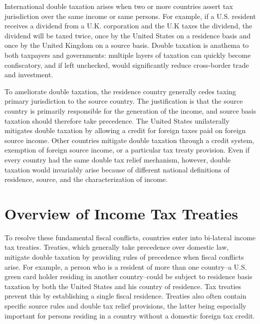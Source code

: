International double taxation arises when two or more countries assert tax jurisdiction over the same income or same persons.  For example, if a U.S. resident receives a dividend from a U.K. corporation and the U.K taxes the dividend, the dividend will be taxed twice, once by the United States on a residence basis and once by the United Kingdom on a source basis.   Double taxation is anathema to both taxpayers and governments: multiple layers of taxation can quickly become confiscatory, and if left unchecked, would significantly reduce cross-border trade and investment.  

To ameliorate double taxation, the residence country generally cedes taxing primary jurisdiction to the source country.  The justification is that the source country is primarily responsible for the generation of the income, and source basis taxation should therefore take precedence. The United States unilaterally mitigates double taxation by allowing a credit for foreign taxes paid on foreign source income.  Other countries mitigate double taxation through a credit system, exemption of foreign source income, or a particular tax treaty provision.  Even if every country had the same double tax relief mechanism, however, double taxation would invariably arise because of different national definitions of residence, source, and the characterization of income.  

	\section{Overview of Income Tax Treaties}
	
To resolve these fundamental fiscal conflicts, countries enter into bi-lateral income tax treaties.  Treaties, which generally take precedence over domestic law, mitigate double taxation by providing rules of precedence when fiscal conflicts arise.  For example, a person who is a resident of more than one country--a U.S. green card holder residing in another country--could be subject to residence basis taxation by both the United States and his country of residence.  Tax treaties prevent this by establishing a single fiscal residence.  Treaties also often contain specific source rules and double tax relief provisions, the latter being especially important for persons residing in a country without a domestic foreign tax credit.   

